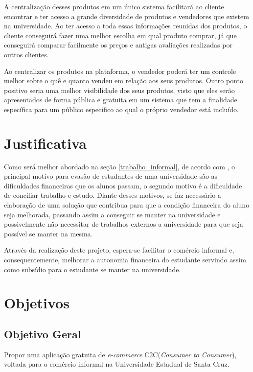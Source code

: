A centralização desses produtos em um único sistema facilitará ao cliente encontrar e ter acesso a grande diversidade de produtos e vendedores que existem na universidade. Ao ter acesso a toda essas informações reunidas dos produtos, o cliente conseguirá fazer uma melhor escolha em qual produto comprar, já que conseguirá comparar facilmente os preços e antigas avaliações realizadas por outros clientes.

Ao centralizar os produtos na plataforma, o vendedor poderá ter um controle melhor sobre o quê e quanto vendeu em relação aos seus produtos. Outro ponto positivo seria uma melhor visibilidade dos seus produtos, visto que eles serão apresentados de forma pública e gratuita em um sistema que tem a finalidade específica para um público específico ao qual o próprio vendedor está incluído.

\section{Justificativa}
\label{sec:justificativa}

Como será melhor abordado na seção \ref{trabalho_informal}, de acordo com \cite{ribeiro2005evasao}, o principal motivo para evasão de estudantes de uma universidade são as dificuldades financeiras que os alunos passam, o segundo motivo é a dificuldade de conciliar trabalho e estudo. Diante desses motivos, se faz necessário a elaboração de uma solução que contribua para que a condição financeira do aluno seja melhorada, passando assim a conseguir se manter na universidade e possivelmente não necessitar de trabalhos externos a universidade para que seja possível se manter na mesma.

Através da realização deste projeto, espera-se facilitar o comércio informal e, consequentemente, melhorar a autonomia financeira do estudante servindo assim como subsídio para o estudante se manter na universidade.

\section{Objetivos}

\subsection{Objetivo Geral}
Propor uma aplicação gratuita de \textit{e-commerce} C2C(\textit{Consumer to Consumer}), voltada para o comércio informal na Universidade Estadual de Santa Cruz.

